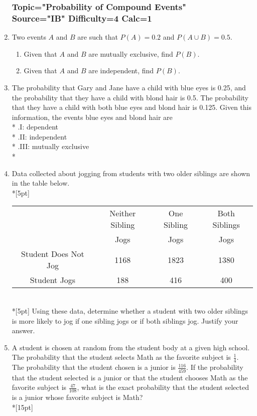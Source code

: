 \documentclass[12pt, oneside]{article}
\begin{document}
\begin{enumerate}
\subsubsection*{Topic="Probability of Compound Events"\\
Source="IB" 
Difficulty=4 
Calc=1}

\item Two events $A$ and $B$ are such that $P(A)=0.2$ and $P(A \cup B) =0.5$. 
\begin{enumerate}
    \item Given that $A$ and $B$ are mutually exclusive, find $P(B)$.
    \item Given that $A$ and $B$ are independent, find $P(B)$.
\end{enumerate}

\item The probability that Gary and Jane have a child with blue eyes is 0.25, and the probability that they have a child with blond hair is 0.5. The probability that they have a child with both blue eyes and blond hair is 0.125. Given this information, the events blue eyes and blond hair are\\*
.\qquad I: dependent\\*
.\qquad II: independent\\*
.\qquad III: mutually exclusive\\* %

\item Data collected about jogging from students with two older siblings are shown in the table below.\\*[5pt]
\begin{tabular}{|c|c|c|c|}
\hline 
& Neither Sibling & One Sibling & Both Siblings\\ 
& Jogs & Jogs & Jogs\\\hline 
Student Does Not Jog & 1168 & 1823 & 1380 \\ 
\hline 
Student Jogs & 188 & 416 & 400 \\ 
\hline 
\end{tabular}\\*[5pt]
Using these data, determine whether a student with two older siblings is more likely to jog if one sibling jogs or if both siblings jog. Justify your answer. %

\item A student is chosen at random from the student body at a given high school. The probability that the student selects Math as the favorite subject is $\frac{1}{4}$. The probability that the student chosen is a junior is $\frac{116}{459}$. If the probability that the student selected is a junior or that the student chooses Math as the favorite subject is $\frac{47}{108}$, what is the exact probability that the student selected is a junior whose favorite subject is Math?\\*[15pt]


\end{enumerate}
\end{document}
